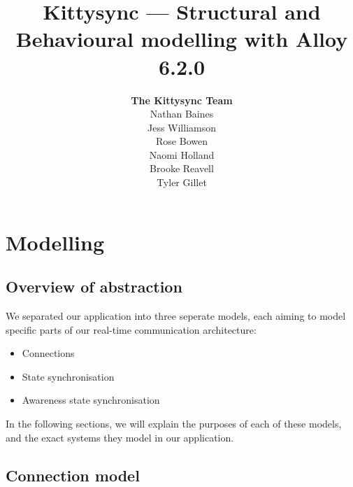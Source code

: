 \documentclass[a4paper, final]{report}
\title{
  Kittysync --- Structural and Behavioural modelling
  with Alloy 6.2.0
}
\author{\textbf{The Kittysync Team} \\
Nathan Baines \\
Jess Williamson \\
Rose Bowen \\
Naomi Holland \\
Brooke Reavell \\
Tyler Gillet
}
\begin{document}
\newenvironment{corollary}[2]
{\begin{lrbox}{\defbox}\begin{varwidth}{0.8\linewidth}\textbf{#1} #2\newline}
			{\end{varwidth}\end{lrbox}\noindent\vspace{1cm}%
	\begin{tikzpicture}
		\node[inner sep=0pt] (content) {\usebox{\defbox}};
		\node[inner sep=8pt, fit=(content)] (box) {};
		\draw[thick] (box.north west) -- (box.south west);
	\end{tikzpicture}%
}

\newenvironment{definition}[1]{\begin{corollary}{Definition}{#1}}{\end{corollary}}


\maketitle

\tableofcontents

\chapter{Modelling}

\section{Overview of abstraction}

We separated our application into three seperate models, each aiming to model specific parts
of our real-time communication architecture:

\begin{itemize}
	\item Connections
	\item State synchronisation
	\item Awareness state synchronisation
\end{itemize}

In the following sections, we will explain the purposes of each of these models,
and the exact systems they model in our application.

\section{Connection model}
\label{sec:connection}
\end{document}
